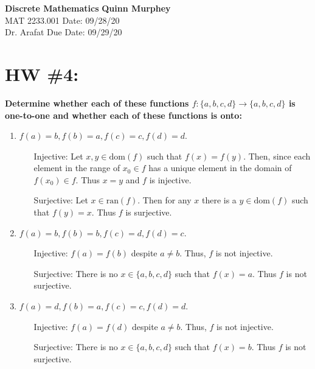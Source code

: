 \documentclass[letterpaper, 12pt]{article}
\begin{document}
\noindent
\large\textbf{Discrete Mathematics} \hfill \textbf{Quinn Murphey} \\
\normalsize MAT 2233.001 \hfill Date: 09/28/20 \\
Dr. Arafat \hfill Due Date: 09/29/20 \\
\noindent\makebox[\linewidth]{\rule{\paperwidth}{0.4pt}}
\section*{HW \#4:}
\textbf{Determine whether each of these functions $f: \{a,b,c,d\} \rightarrow \{a,b,c,d\}$ is one-to-one and whether each of these functions is onto:}
\begin{enumerate}
    \item $f(a) = b, f(b) = a, f(c) = c, f(d) = d$.
    
    \begin{itemize}
        \item[Injective:]  Let $x,y\in \text{dom}(f)$ such that $f(x) = f(y)$. Then, since each element in the range of $x_0\in f$ has a unique element in the domain of $f(x_0)\in f$. Thus $x = y$ and $f$ is injective.
        
        \item[Surjective:] Let $x\in \text{ran}(f)$. Then for any $x$ there is a $y\in\text{dom}(f)$ such that $f(y) = x$. Thus $f$ is surjective.
    \end{itemize}
    
    \item $f(a) = b, f(b) = b, f(c) = d, f(d) = c$.
    
    \begin{itemize}
        \item[Injective:]  $f(a) = f(b)$ despite $a \not= b$. Thus, $f$ is not injective.
        
        \item[Surjective:] There is no $x\in\{a,b,c,d\}$ such that $f(x) = a$. Thus $f$ is not surjective.
    \end{itemize}
    
    \item $f(a) = d, f(b) = a, f(c) = c, f(d) = d$.
    
    \begin{itemize}
        \item[Injective:]  $f(a) = f(d)$ despite $a \not= b$. Thus, $f$ is not injective.
        
        \item[Surjective:] There is no $x\in\{a,b,c,d\}$ such that $f(x) = b$. Thus $f$ is not surjective.
    \end{itemize}
\end{enumerate}
\end{document}

